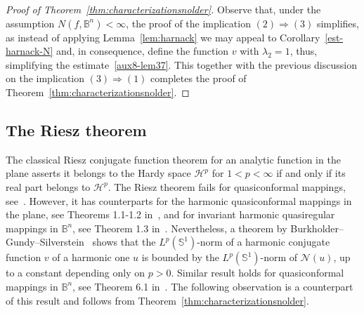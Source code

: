 \documentclass[11pt,a4paper,reqno]{amsart}
\theoremstyle{definition}
\newcommand{\B}{\mathbb{B}^n}
\newcommand{\Nm}{\mathcal{N}}
\newcommand{\Hp}{\mathcal{H}^p}
\numberwithin{komcounter}{section}
\begin{document}
\begin{proof}[Proof of Theorem~\ref{thm:characterizationsnolder}]
Observe that, under the assumption ${N(f,\B)<\infty}$, the proof of the implication $(2)\!\Rightarrow\!(3)$ simplifies, as instead of applying Lemma~\ref{lem:harnack} we may appeal to Corollary~\ref{est-harnack-N} and, in consequence, define the function $v$ with $\lambda_2=1$, thus, simplifying the estimate~\eqref{aux8-lem37}. This together with the previous discussion on the implication $(3)\Rightarrow (1)$  completes the proof of Theorem~\ref{thm:characterizationsnolder}.  
\end{proof}

\subsection{The Riesz theorem}

The classical Riesz conjugate function theorem for an analytic function in the plane asserts it belongs to the Hardy space $\Hp$ for ${1<p<\infty}$ if and only if its real part belongs to $\mathcal{H}^p$. The Riesz theorem fails for quasiconformal mappings, see~\cite[Section 6]{ak}. However, it has counterparts for the harmonic quasiconformal mappings in the plane, see Theorems 1.1-1.2 in~\cite{lz}, and for invariant harmonic quasiregular mappings in $\B$, see Theorem 1.3 in~\cite{lz}. Nevertheless, a theorem by Burkholder--Gundy--Silverstein~\cite{bgs} shows that the $L^p(\mathbb{S}^1)$-norm of a harmonic conjugate function $v$ of a harmonic one $u$ is bounded by the $L^p(\mathbb{S}^1)$-norm of $\Nm(u)$, up to a constant depending only on $p>0$. Similar result holds for quasiconformal mappings in $\B$, see Theorem 6.1 in~\cite{ak}. The following observation is a counterpart of this result and follows from Theorem~\ref{thm:characterizationsnolder}.
\end{document}
